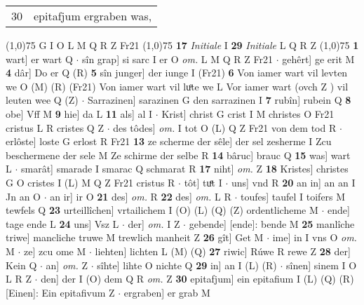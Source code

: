 \documentclass[8pt,a4paper,notitlepage]{article}
\begin{document}
\begin{table}[ht]
\begin{minipage}[t]{0.5\linewidth}
\begin{tabular}{rl}
30 & epitafjum ergraben was,\\ 
\end{tabular}
\scriptsize
\line(1,0){75} \newline
G I O L M Q R Z Fr21 \newline
\line(1,0){75} \newline
\textbf{17} \textit{Initiale} I  \textbf{29} \textit{Initiale} L Q R Z  \newline
\line(1,0){75} \newline
\textbf{1} wart] er wart Q  $\cdot$ sîn grap] si sarc I er O \textit{om.} L M Q R Z Fr21  $\cdot$ gehêrt] ge erit M \textbf{4} dâr] Do er Q (R) \textbf{5} sîn junger] der iunge I (Fr21) \textbf{6} Von iamer wart vil levten we O (M) (R) (Fr21) Von iamer wart vil luͦte we L Vor iamer wart (ovch Z ) vil leuten wee Q (Z)  $\cdot$ Sarrazinen] sarazinen G den sarrazinen I \textbf{7} rubîn] rubein Q \textbf{8} obe] Vff M \textbf{9} hie] da L \textbf{11} als] al I  $\cdot$ Krist] christ G crist I M christes O Fr21 cristus L R cristes Q Z  $\cdot$ des tôdes] \textit{om.} I tot O (L) Q Z Fr21 von dem tod R  $\cdot$ erlôste] loste G erlost R Fr21 \textbf{13} ze scherme der sêle] der sel zesherme I Zcu beschermene der sele M Ze schirme der selbe R \textbf{14} bâruc] brauc Q \textbf{15} was] wart L  $\cdot$ smarât] smarade I smarac Q schmarat R \textbf{17} niht] \textit{om.} Z \textbf{18} Kristes] christes G O cristes I (L) M Q Z Fr21 cristus R  $\cdot$ tôt] tuͤt I  $\cdot$ uns] vnd R \textbf{20} an in] an an I Jn an O  $\cdot$ an ir] ir O \textbf{21} des] \textit{om.} R \textbf{22} des] \textit{om.} L R  $\cdot$ toufes] taufel I toifers M tewfels Q \textbf{23} urteillîchen] vrtailichem I (O) (L) (Q) (Z) ordentlicheme M  $\cdot$ ende] tage ende L \textbf{24} uns] Vsz L  $\cdot$ der] \textit{om.} I Z  $\cdot$ gebende] [ende]: bende M \textbf{25} manlîche triwe] mancliche truwe M trewlich manheit Z \textbf{26} gît] Get M  $\cdot$ ime] in I vns O \textit{om.} M  $\cdot$ ze] zcu ome M  $\cdot$ liehten] lichten L (M) (Q) \textbf{27} riwic] Rúwe R rewe Z \textbf{28} der] Kein Q  $\cdot$ an] \textit{om.} Z  $\cdot$ sîhte] lihte O nichte Q \textbf{29} in] an I (L) (R)  $\cdot$ sînen] sinem I O L R Z  $\cdot$ den] der I (O) dem Q R \textit{om.} Z \textbf{30} epitafjum] ein epitafium I (L) (Q) (R) [Einen]: Ein epitafivum Z  $\cdot$ ergraben] er grab M \newline
\end{minipage}
\hspace{0.5cm}
\begin{minipage}[t]{0.5\linewidth}

\end{minipage}
\end{table}
\end{document}
